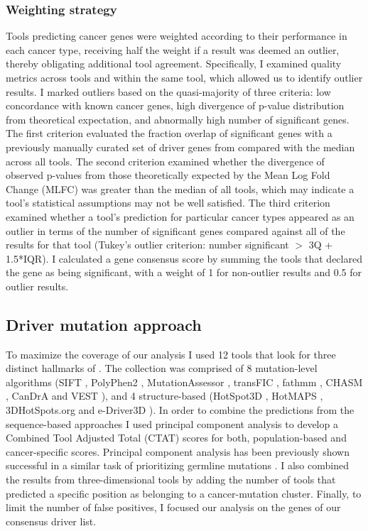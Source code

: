 \subsubsection{Weighting strategy}
\label{sec:weighting}
Tools predicting cancer genes were weighted according to their performance in each cancer type, receiving half the weight if a result was deemed an outlier, thereby obligating additional tool agreement. Specifically, I examined quality metrics across tools and within the same tool, which allowed us to identify outlier results. I marked outliers based on the quasi-majority of three criteria: low concordance with known cancer genes, high divergence of p-value distribution from theoretical expectation, and abnormally high number of significant genes. The first criterion evaluated the fraction overlap of significant genes with a previously manually curated set of driver genes from \cite{RN25} compared with the median across all tools. The second criterion examined whether the divergence of observed p-values from those theoretically expected by the Mean Log Fold Change (MLFC) \cite{RN70} was greater than the median of all tools, which may indicate a tool's statistical assumptions may not be well satisfied. The third criterion examined whether a tool's prediction for particular cancer types appeared as an outlier in terms of the number of significant genes compared against all of the results for that tool (Tukey's outlier criterion: number significant $>$ 3Q + 1.5*IQR). I calculated a gene consensus score by summing the tools that declared the gene as being significant, with a weight of 1 for non-outlier results and 0.5 for outlier results.

\subsection{Driver mutation approach}

To maximize the coverage of our analysis I used 12 tools that look for three distinct hallmarks of .  The collection was comprised of 8 mutation-level algorithms (SIFT \cite{RN9}, PolyPhen2 \cite{RN10}, MutationAssessor \cite{RN38}, transFIC \cite{RN53}, fathmm \cite{RN39}, CHASM \cite{RN29}, CanDrA \cite{RN36} and VEST \cite{RN30}), and 4 structure-based (HotSpot3D \cite{RN132}, HotMAPS \cite{RN60}, 3DHotSpots.org \cite{RN133} and e-Driver3D \cite{RN45}). In order to combine the predictions from the sequence-based approaches I used principal component analysis to develop a Combined Tool Adjusted Total (CTAT) scores for both, population-based and cancer-specific scores. Principal component analysis has been previously shown successful in a similar task of prioritizing germline mutations \cite{RN179}. I also combined the results from three-dimensional tools by adding the number of tools that predicted a specific position as belonging to a cancer-mutation cluster. Finally, to limit the number of false positives, I focused our analysis on the genes of our consensus driver list.

